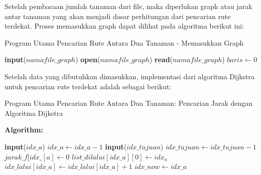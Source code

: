 \documentclass[conference]{IEEEtran}
\begin{document}
	Setelah pembacaan jumlah tanaman dari file, maka diperlukan graph atau jarak antar tanaman yang akan menjadi dasar perhitungan dari pencarian rute terdekat. Proses memasukkan graph dapat dilihat pada algoritma berikut ini:
\begin{algorithm}
\caption{Program Utama Pencarian Rute Antara Dua Tanaman - Memasukkan Graph}\label{alg:five}
\textbf{input}($namafile\_graph$)\;
\textbf{open}($namafile\_graph$)\;
\textbf{read}($namafile\_graph$)\;
$baris \gets 0$\;
\end{algorithm}
\newpage
	Setelah data yang dibutuhkan dimasukkan, implementasi dari algoritma Dijkstra untuk pencarian rute terdekat adalah sebagai berikut:
\begin{algorithm}
\caption{Program Utama Pencarian Rute Antara Dua Tanaman: Pencarian Jarak dengan Algoritma Dijkstra}\label{alg:six}
\textbf{Algorithm:}

\textbf{input}($idx\_a$)\;
$idx\_a \gets idx\_a-1$\;
\textbf{input}($idx\_tujuan$)\;
$idx\_tujuan \gets idx\_tujuan-1$\;
$jarak\_f[idx\_[a] \gets 0$\;
$list\_dilalui[idx\_a] [0] \gets idx_a$\;
$idx\_lalui[idx\_a] \gets idx\_lalui[idx\_a]+1$\;
$idx\_now \gets idx\_a$\;
\end{algorithm}
\newpage
\end{document}
